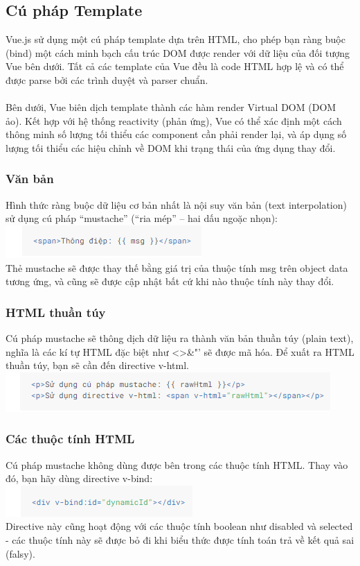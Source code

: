 \documentclass[12pt,a4paper]{report}
\begin{document}
\subsection{Cú pháp Template}
Vue.js sử dụng một cú pháp template dựa trên HTML, cho phép bạn ràng buộc (bind) một cách minh bạch cấu trúc DOM được render với dữ liệu của đối tượng Vue bên dưới. Tất cả các template của Vue đều là code HTML hợp lệ và có thể được parse bởi các trình duyệt và parser chuẩn. \\\\ Bên dưới, Vue biên dịch template thành các hàm render Virtual DOM (DOM ảo). Kết hợp với hệ thống reactivity (phản ứng), Vue có thể xác định một cách thông minh số lượng tối thiểu các component cần phải render lại, và áp dụng số lượng tối thiểu các hiệu chỉnh về DOM khi trạng thái của ứng dụng thay đổi. 
\subsubsection{Văn bản}
Hình thức ràng buộc dữ liệu cơ bản nhất là nội suy văn bản (text interpolation) sử dụng cú pháp “mustache” (“ria mép” – hai dấu ngoặc nhọn):\\
\includegraphics[scale=1]{10}\\Thẻ mustache sẽ được thay thế bằng giá trị của thuộc tính msg trên object data tương ứng, và cũng sẽ được cập nhật bất cứ khi nào thuộc tính này thay đổi.
\subsubsection{HTML thuần túy}
Cú pháp mustache sẽ thông dịch dữ liệu ra thành văn bản thuần túy (plain text), nghĩa là các kí tự HTML đặc biệt như <>\&"' sẽ được mã hóa. Để xuất ra HTML thuần túy, bạn sẽ cần đến directive v-html.\\
\includegraphics[scale=1]{11}
\subsubsection{Các thuộc tính HTML}
Cú pháp mustache không dùng được bên trong các thuộc tính HTML. Thay vào đó, bạn hãy dùng directive v-bind:
\\\includegraphics[scale=1]{12}\\Directive này cũng hoạt động với các thuộc tính boolean như disabled và selected - các thuộc tính này sẽ được bỏ đi khi biểu thức được tính toán trả về kết quả sai (falsy).
\end{document}
